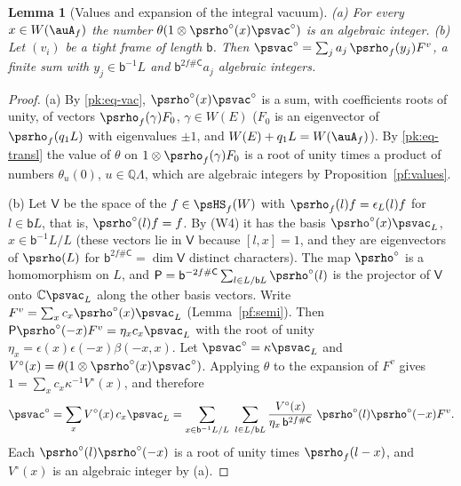 \documentclass[10pt]{amsart}
\newtheorem{lemma}[theorem]{Lemma}
\theoremstyle{definition}
\theoremstyle{remark}
\newcommand{\C}{\mathbb C}
\newcommand{\Q}{\mathbb Q}
\begin{document}
\begin{lemma}[Values and expansion of the integral vacuum]\label{pf:fourier}
{\rm(a)} For every $x\in W(\auA_f)$ the number $\theta(1\otimes\psrho^\circ(x)\psvac^\circ)$ is an
algebraic integer.
{\rm(b)} Let $(v_i)$ be a tight frame of length $\mathsf b$. Then $\psvac^\circ=\sum_ja_j\,
\psrho_f(y_j)F^v$, a finite sum with $y_j\in\mathsf b^{-1}L$ and $\mathsf b^{2f\#\mathsf C}a_j$
algebraic integers.
\end{lemma}
\begin{proof}
(a) By \eqref{pk:eq-vac}, $\psrho^\circ(x)\psvac^\circ$ is a sum, with coefficients roots of unity,
of vectors $\psrho_f(\gamma)F_0$, $\gamma\in W(E)$ ($F_0$ is an eigenvector of $\psrho_f(q_1L)$
with eigenvalues $\pm1$, and $W(E)+q_1L=W(\auA_f)$). By \eqref{pk:eq-transl} the value of $\theta$
on $1\otimes\psrho_f(\gamma)F_0$ is a root of unity times a product of numbers $\theta_u(0)$,
$u\in\Q\Lambda$, which are algebraic integers by Proposition~\ref{pf:values}.

(b) Let $\mathsf V$ be the space of the $f\in\psHS_f(W)$ with $\psrho_f(l)f=\epsilon_L(l)f$ for
$l\in\mathsf bL$, that is, $\psrho^\circ(l)f=f$. By (W4) it has the basis $\psrho^\circ(x)\psvac_L$,
$x\in\mathsf b^{-1}L/L$ (these vectors lie in $\mathsf V$ because $[l,x]=1$, and they are
eigenvectors of $\psrho(L)$ for $\mathsf b^{2f\#\mathsf C}=\dim\mathsf V$ distinct characters). The
map $\psrho^\circ$ is a homomorphism on $L$, and $\mathsf P=\mathsf b^{-2f\#\mathsf C}\sum_{l\in
L/\mathsf bL}\psrho^\circ(l)$ is the projector of $\mathsf V$ onto $\C\psvac_L$ along the other
basis vectors. Write $F^v=\sum_xc_x\psrho^\circ(x)\psvac_L$ (Lemma~\ref{pf:semi}). Then $\mathsf
P\psrho^\circ(-x)F^v=\eta_xc_x\psvac_L$ with the root of unity $\eta_x=\epsilon(x)\epsilon(-x)
\beta(-x,x)$. Let $\psvac^\circ=\kappa\psvac_L$ and $V^\circ(x)=\theta(1\otimes\psrho^\circ(x)
\psvac^\circ)$. Applying $\theta$ to the expansion of $F^v$ gives $1=\sum_xc_x\kappa^{-1}V^\circ
(x)$, and therefore
\[
\psvac^\circ=\sum_xV^\circ(x)\,c_x\psvac_L=\sum_{x\in\mathsf b^{-1}L/L}\ \sum_{l\in L/\mathsf bL}
\frac{V^\circ(x)}{\eta_x\,\mathsf b^{2f\#\mathsf C}}\;\psrho^\circ(l)\psrho^\circ(-x)F^v .
\]
Each $\psrho^\circ(l)\psrho^\circ(-x)$ is a root of unity times $\psrho_f(l-x)$, and $V^\circ(x)$
is an algebraic integer by (a).
\end{proof}
\end{document}
